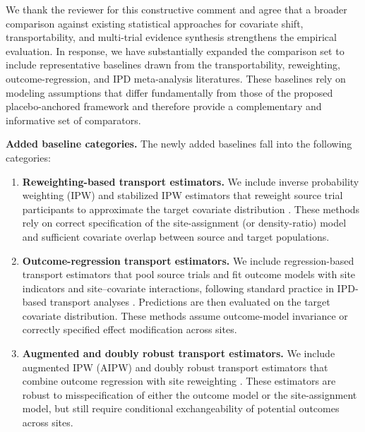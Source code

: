 {\color{blue}
We thank the reviewer for this constructive comment and agree that a broader comparison against existing statistical approaches for covariate shift, transportability, and multi-trial evidence synthesis strengthens the empirical evaluation. In response, we have substantially expanded the comparison set to include representative baselines drawn from the transportability, reweighting, outcome-regression, and IPD meta-analysis literatures. These baselines rely on modeling assumptions that differ fundamentally from those of the proposed placebo-anchored framework and therefore provide a complementary and informative set of comparators.

\medskip
\noindent
\textbf{Added baseline categories.}
The newly added baselines fall into the following categories:

\begin{enumerate}
\item \textbf{Reweighting-based transport estimators.}  
We include inverse probability weighting (IPW) and stabilized IPW estimators that reweight source trial participants to approximate the target covariate distribution \citep{dahabreh2023efficient, westreich2017transportability}. These methods rely on correct specification of the site-assignment (or density-ratio) model and sufficient covariate overlap between source and target populations.

\item \textbf{Outcome-regression transport estimators.}  
We include regression-based transport estimators that pool source trials and fit outcome models with site indicators and site--covariate interactions, following standard practice in IPD-based transport analyses \citep{hong2025estimating}. Predictions are then evaluated on the target covariate distribution. These methods assume outcome-model invariance or correctly specified effect modification across sites.

\item \textbf{Augmented and doubly robust transport estimators.}  
We include augmented IPW (AIPW) and doubly robust transport estimators that combine outcome regression with site reweighting \citep{dahabreh2019towards}. These estimators are robust to misspecification of either the outcome model or the site-assignment model, but still require conditional exchangeability of potential outcomes across sites.

\end{enumerate}



}
